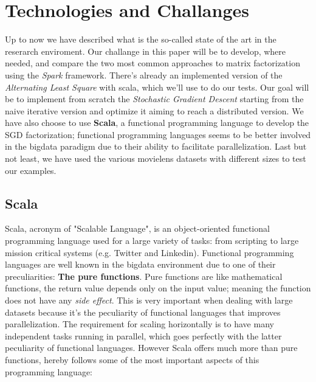 \documentclass{sig-alternate-05-2015}
\begin{document}
\section{Technologies and Challanges}

Up to now we have described what is the so-called
state of the art in the reserarch enviroment.
Our challange in this paper will be to develop, where needed,
and compare the two most common approaches to matrix factorization using
the \textit{Spark} framework. There's already an implemented version
of the \textit{Alternating Least Square} with scala, which we'll use
to do our tests. Our goal will be to implement from scratch
the \textit{Stochastic Gradient Descent}
starting from the naive iterative version and optimize it aiming to reach
a distributed version.
We have also choose to use \textbf{Scala}, a functional programming language
to develop the SGD factorization; functional programming languages seems
to be better involved in the bigdata paradigm due to their ability
to facilitate parallelization.
Last but not least, we have used the various movielens datasets with different sizes
to test our examples.

\subsection{Scala}
Scala, acronym of "Scalable Language", is an object-oriented functional programming
language used for a large variety of tasks: from scripting to large mission
critical systems (e.g. Twitter and Linkedin).
Functional programming languages are well known in the bigdata environment
due to one of their preculiarities: \textbf{The pure functions}.
Pure functions are like mathematical functions, the return value depends only
on the input value; meaning the function does not have any \textit{side effect}.
This is very important when dealing with large datasets because it's the peculiarity
of functional languages that improves parallelization. The requirement
for scaling horizontally is to have many independent tasks running in parallel,
which goes perfectly with the latter peculiarity of functional languages.
However Scala offers much more than pure functions, hereby follows some of
the most important aspects of this programming language:\\
\end{document}
